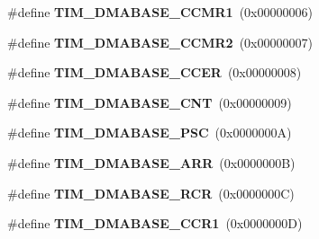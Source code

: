 \begin{DoxyCompactItemize}
\item 
\#define {\bfseries T\+I\+M\+\_\+\+D\+M\+A\+B\+A\+S\+E\+\_\+\+C\+C\+M\+R1}~(0x00000006)\hypertarget{group___t_i_m___d_m_a___base__address_gac94d74bf77d5ce139c7fa6e0b8c2da44}{}\label{group___t_i_m___d_m_a___base__address_gac94d74bf77d5ce139c7fa6e0b8c2da44}

\item 
\#define {\bfseries T\+I\+M\+\_\+\+D\+M\+A\+B\+A\+S\+E\+\_\+\+C\+C\+M\+R2}~(0x00000007)\hypertarget{group___t_i_m___d_m_a___base__address_ga94f3dcf13674f397fee0ef816ad973cf}{}\label{group___t_i_m___d_m_a___base__address_ga94f3dcf13674f397fee0ef816ad973cf}

\item 
\#define {\bfseries T\+I\+M\+\_\+\+D\+M\+A\+B\+A\+S\+E\+\_\+\+C\+C\+ER}~(0x00000008)\hypertarget{group___t_i_m___d_m_a___base__address_ga64cb24a6d9d96d950be64586923c7447}{}\label{group___t_i_m___d_m_a___base__address_ga64cb24a6d9d96d950be64586923c7447}

\item 
\#define {\bfseries T\+I\+M\+\_\+\+D\+M\+A\+B\+A\+S\+E\+\_\+\+C\+NT}~(0x00000009)\hypertarget{group___t_i_m___d_m_a___base__address_gae711483dbf4f0eafb2505b8f823c4724}{}\label{group___t_i_m___d_m_a___base__address_gae711483dbf4f0eafb2505b8f823c4724}

\item 
\#define {\bfseries T\+I\+M\+\_\+\+D\+M\+A\+B\+A\+S\+E\+\_\+\+P\+SC}~(0x0000000\+A)\hypertarget{group___t_i_m___d_m_a___base__address_gae23315a3ef1af7dccfbbfada90355bd8}{}\label{group___t_i_m___d_m_a___base__address_gae23315a3ef1af7dccfbbfada90355bd8}

\item 
\#define {\bfseries T\+I\+M\+\_\+\+D\+M\+A\+B\+A\+S\+E\+\_\+\+A\+RR}~(0x0000000\+B)\hypertarget{group___t_i_m___d_m_a___base__address_ga3e08cd689d59f76dd5ca958a0ffdfb3d}{}\label{group___t_i_m___d_m_a___base__address_ga3e08cd689d59f76dd5ca958a0ffdfb3d}

\item 
\#define {\bfseries T\+I\+M\+\_\+\+D\+M\+A\+B\+A\+S\+E\+\_\+\+R\+CR}~(0x0000000\+C)\hypertarget{group___t_i_m___d_m_a___base__address_gac26cff34f1d207798b946c01a40f5d89}{}\label{group___t_i_m___d_m_a___base__address_gac26cff34f1d207798b946c01a40f5d89}

\item 
\#define {\bfseries T\+I\+M\+\_\+\+D\+M\+A\+B\+A\+S\+E\+\_\+\+C\+C\+R1}~(0x0000000\+D)\hypertarget{group___t_i_m___d_m_a___base__address_ga2d1bc7e5ae83b91caa352276d15142dc}{}\label{group___t_i_m___d_m_a___base__address_ga2d1bc7e5ae83b91caa352276d15142dc}


\end{DoxyCompactItemize}
